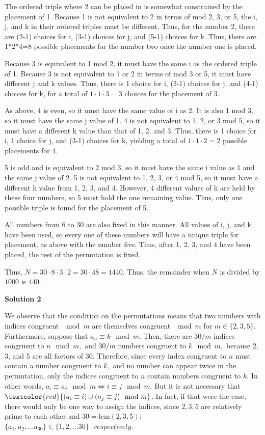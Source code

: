 \begin{enumerate}
 The ordered triple where 2 can be placed in is somewhat constrained by the placement of 1. Because 1 is not equivalent to 2 in terms of mod 2, 3, or 5, the i, j, and k in their ordered triples must be different. Thus, for the number 2, there are (2-1) choices for i, (3-1) choices for j, and (5-1) choices for k. Thus, there are 1*2*4=8 possible placements for the number two once the number one is placed.

 Because 3 is equivalent to 1 mod 2, it must have the same i as the ordered triple of 1. Because 3 is not equivalent to 1 or 2 in terms of mod 3 or 5, it must have different j and k values. Thus, there is 1 choice for i, (2-1) choices for j, and (4-1) choices for k, for a total of $1\cdot 1 \cdot 3=3$ choices for the placement of 3.

 As above, 4 is even, so it must have the same value of i as 2. It is also 1 mod 3, so it must have the same j value of 1. 4 is not equivalent to 1, 2, or 3 mod 5, so it must have a different k value than that of 1, 2, and 3. Thus, there is 1 choice for i, 1 choice for j, and (3-1) choices for k, yielding a total of $1 \cdot 1 \cdot 2=2$ possible placements for 4.

 5 is odd and is equivalent to 2 mod 3, so it must have the same i value as 1 and the same j value of 2. 5 is not equivalent to 1, 2, 3, or 4 mod 5, so it must have a different k value from 1, 2, 3, and 4. However, 4 different values of k are held by these four numbers, so 5 must hold the one remaining value. Thus, only one possible triple is found for the placement of 5.

 All numbers from 6 to 30 are also fixed in this manner. All values of i, j, and k have been used, so every one of these numbers will have a unique triple for placement, as above with the number five. Thus, after 1, 2, 3, and 4 have been placed, the rest of the permutation is fixed. 

 Thus, $N = 30 \cdot 8 \cdot 3 \cdot 2=30 \cdot 48=1440$. Thus, the remainder when $N$ is divided by $1000$ is $\boxed{440}.$




\textbf{Solution 2}

We observe that the condition on the permutations means that two numbers with indices congruent $\mod m$ are themselves congruent $\mod m$ for $m \in \{ 2,3,5\}.$ Furthermore, suppose that $a_n \equiv k \mod m.$ Then, there are $30/m$ indices congruent to $n \mod m,$ and $30/m$ numbers congruent to $k \mod m,$ because 2, 3, and 5 are all factors of 30. Therefore, since every index congruent to $n$ must contain a number congruent to $k,$ and no number can appear twice in the permutation, only the indices congruent to $n$ contain numbers congruent to $k.$ In other words, $a_i \equiv a_j \mod m \iff i \equiv j \mod m.$ But it is not necessary that $\textcolor{red}{(a_i\equiv i)\cup (a_j\equiv j)\mod m}$. In fact, if that were the case, there would only be one way to assign the indices, since $2,3,5$ are relatively prime to each other and $30=\text{lcm}(2,3,5)$: $\{a_1,a_2,\dots a_{30}\}\in\{1,2,\dots 30\}\text{ }respectively$.


\end{enumerate}

